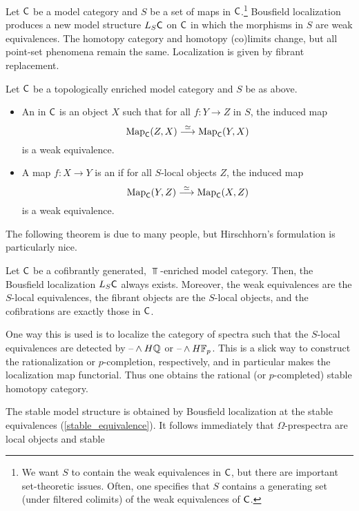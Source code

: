 Let $\mathsf C$ be a model category and $S$ be a set of maps in $\mathsf C$.\footnote{We want $S$ to contain the weak
equivalences in $\mathsf C$, but there are important set-theoretic issues. Often, one specifies that $S$ contains a
generating set (under filtered colimits) of the weak equivalences of $\mathsf C$.} Bousfield localization produces a new
model structure $L_S\mathsf C$ on $\mathsf C$ in which the morphisms in $S$ are weak equivalences. The homotopy category and
homotopy (co)limits change, but all point-set phenomena remain the same. Localization is given by fibrant
replacement.
\begin{defn}
Let $\mathsf C$ be a topologically enriched model category and $S$ be as above.
\begin{itemize}
	\item An  in $\mathsf C$ is an object $X$ such that for all
	$f\colon Y\to Z$ in $S$, the induced map
	\[\operatorname{Map}_\mathsf C(Z,X)\stackrel\simeq\longrightarrow \operatorname{Map}_\mathsf C(Y, X)\]
	is a weak equivalence.
	\item A map $f\colon X\to Y$ is an  if
	for all $S$-local objects $Z$, the induced map
	\[\operatorname{Map}_\mathsf C(Y,Z)\stackrel\simeq\longrightarrow \operatorname{Map}_\mathsf C(X,Z)\]
	is a weak equivalence.
\end{itemize}
\end{defn}
The following theorem is due to many people, but Hirschhorn's formulation is particularly nice.
\begin{thm}
Let $\mathsf C$ be a cofibrantly generated, $\Top$-enriched model category. Then, the Bousfield localization $L_S\mathsf C$
always exists. Moreover, the weak equivalences are the $S$-local equivalences, the fibrant objects are the
$S$-local objects, and the cofibrations are exactly those in $\mathsf C$.
\end{thm}
\begin{exm}
One way this is used is to localize the category of spectra such that the $S$-local equivalences are detected by
$\text{--}\wedge H\mathbb Q$ or $\text{--}\wedge H\mathbb F_p$. This is a slick way to construct the rationalization or $p$-completion,
respectively, and in particular makes the localization map functorial. Thus one obtains the rational (or
$p$-completed) stable homotopy category.
\end{exm}
The stable model structure is obtained by Bousfield localization at the stable equivalences
(\cref{stable_equivalence}). It follows immediately that $\Omega$-prespectra are local objects and stable
